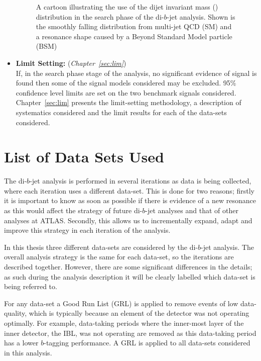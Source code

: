 \begin{itemize}[leftmargin=*]
\begin{figure}[!hbt]
\begin{center}
  \end{center}
  \vspace{-3mm}
  \caption{A cartoon illustrating the use of the dijet invariant mass (\mjj) distribution in the search phase of the di-$b$-jet analysis.
            Shown is the smoothly falling distribution from multi-jet QCD (SM)
            and a resonance shape caused by a Beyond Standard Model particle (BSM)}
          \label{fig:evt-dijet_schem}
  \end{figure}
  \vspace{-4mm}
 
\item\textbf{Limit Setting:} (\textit{Chapter~\ref{sec:lim}})\\
  If, in the search phase stage of the analysis, no significant evidence of signal is
  found then some of the signal models considered may be excluded.
  95\% confidence level limits are set on the two benchmark signals considered.
  Chapter~\ref{sec:lim} presents the limit-setting methodology,
  a description of systematics considered
  and the limit results for each of the data-sets considered.

\end{itemize}

\section{List of Data Sets Used}
\label{sec:evt-datasets}

The di-$b$-jet analysis is performed in several iterations
as data is being collected, where each iteration uses a different data-set.
This is done for two reasons;
firstly it is important to know as soon as possible
if there is evidence of a new resonance as
this would affect the strategy of future di-$b$-jet analyses and that of other analyses at ATLAS.
Secondly, this allows us to incrementally
expand, adapt and improve this strategy in each iteration of the analysis.

In this thesis three different data-sets are considered by the di-$b$-jet analysis.
The overall analysis strategy is the same for each data-set,
so the iterations are described together.
However, there are some significant differences in the details;
as such during the analysis description it will be clearly labelled
which data-set is being referred to.

For any data-set a Good Run List (GRL)
is applied to remove events of low data-quality,
which is typically because an element of the detector was not operating optimally.
For example, data-taking periods where the inner-most layer of the inner detector,
the IBL, was not operating are removed as
this data-taking period has a lower $b$-tagging performance.
A GRL is applied to all data-sets considered in this analysis.

